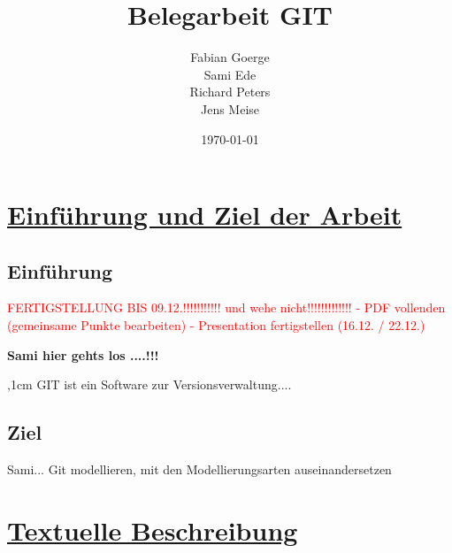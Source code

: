 \documentclass[a4paper]{article}
\begin{document}
\title{\textbf{{\Huge Belegarbeit GIT}}}
\author{Fabian Goerge \\  Sami Ede \\ Richard Peters \\ Jens Meise}
\date{\today}
\maketitle
\newpage
\tableofcontents
\newpage


\section{\underline{Einführung und Ziel der Arbeit}}

\subsection{Einführung}



\textcolor{red}{
	FERTIGSTELLUNG BIS 09.12.!!!!!!!!!!! 
	und wehe nicht!!!!!!!!!!!!!\newline
	- PDF vollenden (gemeinsame Punkte bearbeiten)\newline
	- Presentation fertigstellen (16.12. / 22.12.)\newline
}	

	\textbf{Sami hier gehts los ....!!!}
	
	\par
\begingroup
{},1cm 
\noindent GIT ist ein Software zur Versionsverwaltung....
\par
\endgroup
	
\subsection{Ziel}
	Sami...
	Git modellieren, mit den Modellierungsarten auseinandersetzen	



\section{\underline{Textuelle Beschreibung}}
\end{document}
